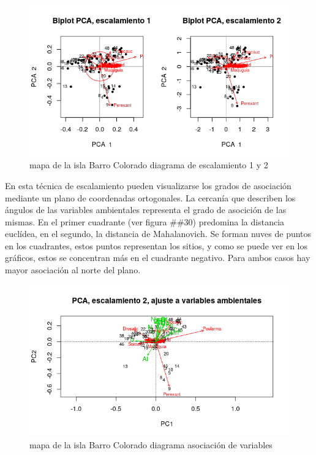 \documentclass[11pt,]{article}
\begin{document}
\begin{figure}
\centering
\includegraphics[width=1.00000\textwidth]{escalamiento_1_2.png}
\caption{mapa de la isla Barro Colorado diagrama de escalamiento 1 y 2
\label{fig:bci_map}}
\end{figure}

En esta técnica de escalamiento pueden visualizarse los grados de
asociación mediante un plano de coordenadas ortogonales. La cercanía que
describen los ángulos de las variables ambientales representa el grado
de asocición de las mismas. En el primer cuadrante (ver figura \#\#30)
predomina la distancia euclídea, en el segundo, la distancia de
Mahalanovich. Se forman nuves de puntos en los cuadrantes, estos puntos
representan los sitios, y como se puede ver en los gráficos, estos se
concentran más en el cuadrante negativo. Para ambos casos hay mayor
asociación al norte del plano.

\begin{figure}
\centering
\includegraphics[width=1.00000\textwidth]{escalamiento_ajuste_2.png}
\caption{mapa de la isla Barro Colorado diagrama asociación de
variables\label{fig:bci_map}}
\end{figure}
\end{document}
